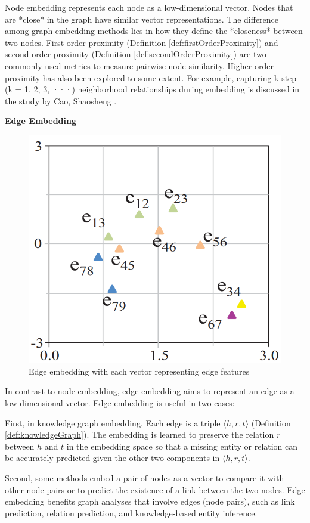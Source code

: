 Node embedding represents each node as a low-dimensional vector. Nodes that are *close* in the graph have similar vector representations. The difference among graph embedding methods lies in how they define the *closeness* between two nodes. First-order proximity (Definition \ref{def:firstOrderProximity}) and second-order proximity (Definition \ref{def:secondOrderProximity}) are two commonly used metrics to measure pairwise node similarity. Higher-order proximity has also been explored to some extent. For example, capturing k-step (k = 1, 2, 3, ···) neighborhood relationships during embedding is discussed in the study by Cao, Shaosheng \cite{cao2015grarep}.

\textbf{Edge Embedding}
\label{sec:edgeEmbedding}

\begin{figure}[htp]
	\centering
	\includegraphics[width=7 cm]{images/graph_emb_3.png}
	\caption{Edge embedding with each vector representing edge features}
	\label{fig:edgeEmbedding}
\end{figure}

In contrast to node embedding, edge embedding aims to represent an edge as a low-dimensional vector. Edge embedding is useful in two cases:

First, in knowledge graph embedding. Each edge is a triple $\langle h, r, t \rangle$ (Definition \ref{def:knowledgeGraph}). The embedding is learned to preserve the relation $r$ between $h$ and $t$ in the embedding space so that a missing entity or relation can be accurately predicted given the other two components in $\langle h, r, t \rangle$.

Second, some methods embed a pair of nodes as a vector to compare it with other node pairs or to predict the existence of a link between the two nodes. Edge embedding benefits graph analyses that involve edges (node pairs), such as link prediction, relation prediction, and knowledge-based entity inference.

